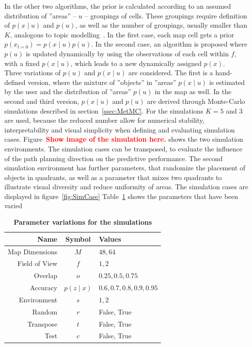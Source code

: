 \documentclass[twocolumn,letterpaper]{IEEEAerospaceCLS}  %
\newcommand\todo[1]{\textbf{\textcolor{red}{#1}}}
\begin{document}
In the other two algorithms, the prior is calculated according to an assumed distribution of ''areas'' -- $u$ -- groupings of cells. These groupings require definition of $p(x\mid u)$ and $p(u)$, as well as the number of groupings, usually smaller than $K$, analogous to topic modelling~\cite{blei_latent_2003}. In the first case, each map cell gets a prior $p(x_{t=0}) = p(x\mid u)p(u)$. In the second case, an algorithm is proposed where $p(u)$ is updated dynamically by using the observations of each cell within $f$, with a fixed $p(x\mid u)$, which leads to a new dynamically assigned $p(x)$.\\
Three variations of $p(u)$ and $p(x\mid u)$ are considered. The first is a hand-defined version, where the mixture of ''objects'' in ''areas'' $p(x\mid u)$ is estimated by the user and the distribution of ''areas'' $p(u)$ in the map as well. In the second and third version, $p(x\mid u)$ and $p(u)$ are derived through Monte-Carlo simulations described in section~\ref{ssec:MetMC}. For the simulations $K=5$ and $3$ are used, because the reduced number allow for numerical stability, interpretability and visual simplicity when defining and evaluating simulation cases. Figure~\todo{Show image of the simulation here.} shows the two simulation environments.
The simulation cases can be transposed, to evaluate the influence of the path planning direction on the predictive performance. The second simulation environment has further parameters, that randomize the placement of objects in quadrants, as well as a parameter that mixes two quadrants to illustrate visual diversity and reduce uniformity of areas. The simulation cases are displayed in figure~\ref{fig:SimCase} Table~\ref{tab:params} shows the parameters that have been varied 
\begin{table}[]
    \renewcommand{\arraystretch}{1.3}
    \caption{\bf Parameter variations for the simulations}
    \label{tab:params}
    \centering
    \begin{tabular}{|r||c|l|}
        \hline
        \bfseries Name      & \bfseries Symbol & \bfseries Values       \\
        \hline \hline
        Map Dimensions & $M$ & $48, 64$\\
        \hline
        Field of View  & $f$              & $1, 2$ \\
        \hline
        Overlap     & $o$              & $0.25, 0.5, 0.75$         \\
        \hline
        Accuracy & $p(z\mid x)$              & $0.6, 0.7, 0.8, 0.9, 0.95$        \\
        \hline
        Environment & $s$& $1, 2$ \\
        \hline
        Random & $r$ & False, True \\
        \hline
        Transpose & $t$ & False, True \\
        \hline
        Test & $c$ & False, True \\
        \hline
    \end{tabular}
\end{table}
\end{document}
